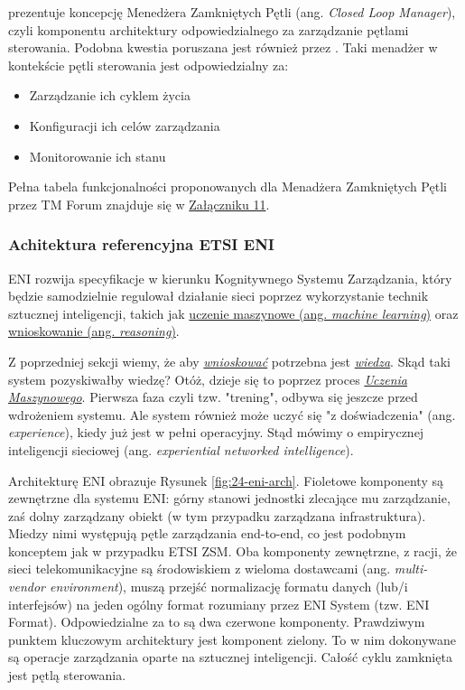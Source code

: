 \cite{tmforum2022ai} prezentuje koncepcję Menedżera Zamkniętych Pętli (ang. \textit{Closed Loop Manager}), czyli komponentu architektury odpowiedzialnego za zarządzanie pętlami sterowania. Podobna kwestia poruszana jest również przez \cite{ngmn2022}. Taki menadżer w kontekście pętli sterowania jest odpowiedzialny za:
\begin{itemize}
    \item Zarządzanie ich cyklem życia 
    \item Konfiguracji ich celów zarządzania
    \item Monitorowanie ich stanu
\end{itemize}

Pełna tabela funkcjonalności proponowanych dla Menadżera Zamkniętych Pętli przez TM Forum znajduje się w \hyperlink{appendix:11}{Załączniku 11}.

\subsubsection{Achitektura referencyjna ETSI ENI}

ENI rozwija specyfikacje w kierunku Kognitywnego Systemu Zarządzania, który będzie samodzielnie regulował działanie sieci poprzez wykorzystanie technik sztucznej inteligencji, takich jak \hyperlink{def:uczenie-maszynowe}{uczenie maszynowe (ang. \textit{machine learning})} oraz \hyperlink{def:wnioskowanie}{wnioskowanie (ang. \textit{reasoning})}. 

Z poprzedniej sekcji wiemy, że aby \hyperlink{def:wnioskowanie}{\textit{wnioskować}} potrzebna jest \hyperlink{def:wiedza}{\textit{wiedza}}. Skąd taki system pozyskiwałby wiedzę? Otóż, dzieje się to poprzez proces \hyperlink{def:uczenie-maszynowe}{\textit{Uczenia Maszynowego}}. Pierwsza faza czyli tzw. "trening", odbywa się jeszcze przed wdrożeniem systemu. Ale system również może uczyć się "z doświadczenia" (ang. \textit{experience}), kiedy już jest w pełni operacyjny. Stąd mówimy o empirycznej inteligencji sieciowej (ang. \textit{experiential networked intelligence}). 

Architekturę \cite{etsieni2023} ENI obrazuje Rysunek \ref{fig:24-eni-arch}. Fioletowe komponenty są zewnętrzne dla systemu ENI: górny stanowi jednostki zlecające mu zarządzanie, zaś dolny zarządzany obiekt (w tym przypadku zarządzana infrastruktura). Miedzy nimi występują pętle zarządzania end-to-end, co jest podobnym konceptem jak w przypadku ETSI ZSM. Oba komponenty zewnętrzne, z racji, że sieci telekomunikacyjne są środowiskiem z wieloma dostawcami (ang. \textit{multi-vendor environment}), muszą przejść normalizację formatu danych (lub/i interfejsów) na jeden ogólny format rozumiany przez ENI System (tzw. ENI Format). Odpowiedzialne za to są dwa czerwone komponenty. Prawdziwym punktem kluczowym architektury jest komponent zielony. To w nim dokonywane są operacje zarządzania oparte na sztucznej inteligencji. Całość cyklu zamknięta jest pętlą sterowania. 

